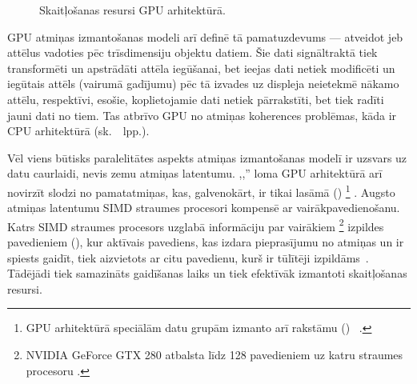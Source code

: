 \begin{figure}[tbh]
	\centering
	\def\svgscale{1.2}
	{}
	\caption{Skaitļošanas resursi GPU arhitektūrā.}
	\label{fig:gpu-arch}
\end{figure}

GPU atmiņas izmantošanas modeli arī definē tā pamatuzdevums --- atveidot jeb
 attēlus vadoties pēc trīsdimensiju objektu datiem.
Šie dati signāltraktā tiek transformēti un apstrādāti attēla iegūšanai,
bet ieejas dati  netiek modificēti
un iegūtais attēls (vairumā gadījumu) pēc tā izvades uz displeja neietekmē
nākamo attēlu, respektīvi, esošie, koplietojamie dati netiek pārrakstīti,
bet tiek radīti jauni dati no tiem. Tas atbrīvo GPU no atmiņas koherences
problēmas, kāda ir CPU arhitektūrā (sk.~\pageref{sec:cache}~lpp.).

Vēl viens būtisks paralelitātes aspekts atmiņas izmantošanas modelī ir
uzsvars uz datu caurlaidi, nevis zemu atmiņas latentumu.
,,'' loma GPU arhitektūrā arī novirzīt slodzi no
pamatatmiņas, kas, galvenokārt, ir tikai lasāmā
() %
\footnote{GPU arhitektūrā speciālām datu grupām izmanto arī
	rakstāmu () ~\cite{Owens-GPU}.}
\cite{Fatahalian}. Augsto atmiņas latentumu SIMD straumes procesori kompensē
ar vairākpavedienošanu. Katrs SIMD straumes procesors uzglabā informāciju
par vairākiem%
\footnote{NVIDIA GeForce GTX 280 atbalsta līdz 128 pavedieniem uz katru
	straumes procesoru \cite{Fatahalian}.}
izpildes pavedieniem (), kur aktīvais pavediens, kas izdara
pieprasījumu no atmiņas un ir spiests gaidīt, tiek aizvietots ar
citu pavedienu, kurš ir tūlītēji izpildāms~\cite{Fatahalian}. Tādējādi tiek samazināts
gaidīšanas laiks un tiek efektīvāk izmantoti skaitļošanas resursi.


